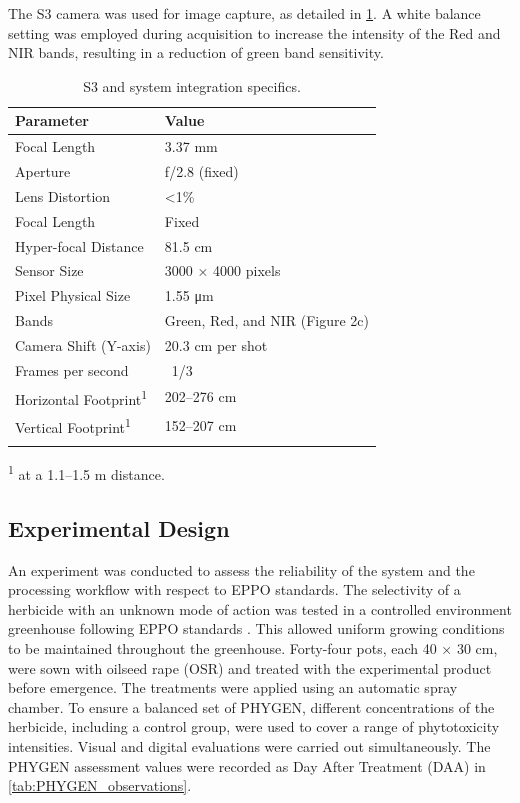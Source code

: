 \documentclass[12pt,a4paper,oneside]{report}
\begin{document}
The S3 camera was used for image capture, as detailed in \cref{tab:system_specifics}. A white balance setting was employed during acquisition to increase the intensity of the Red and NIR bands, resulting in a reduction of green band sensitivity.

\begin{table}[H]
\centering
\caption{S3 and system integration specifics.}
\begin{tabular}{p{5cm} p{5cm}}
\toprule
\textbf{Parameter} & \textbf{Value} \\
\midrule
Focal Length & 3.37 mm \\
Aperture & f/2.8 (fixed) \\
Lens Distortion & <1\% \\
Focal Length & Fixed \\
Hyper-focal Distance & 81.5 cm \\
Sensor Size & 3000 × 4000 pixels \\
Pixel Physical Size	& 1.55 μm \\
Bands & Green, Red, and NIR (Figure 2c) \\
Camera Shift (Y-axis)	& 20.3 cm per shot \\
Frames per second	& ~1/3 \\
Horizontal Footprint\textsuperscript{1}	& 202–276 cm \\
Vertical Footprint\textsuperscript{1}	& 152–207 cm \\
\bottomrule
\label{tab:system_specifics}
\end{tabular}
\footnotesize{\textsuperscript{1} at a 1.1–1.5 m distance.}
\end{table}

\subsection{Experimental Design}

An experiment was conducted to assess the reliability of the system and the processing workflow with respect to EPPO standards. The selectivity of a herbicide with an unknown mode of action was tested in a controlled environment greenhouse following EPPO standards 
\cite{PP11352014,DesignAnalysisEfficacy2012,PP13192021,PP11812022}. This allowed uniform growing conditions to be maintained throughout the greenhouse. Forty-four pots, each 40 × 30 cm, were sown with oilseed rape (OSR) and treated with the experimental product before emergence. The treatments were applied using an automatic spray chamber. To ensure a balanced set of PHYGEN, different concentrations of the herbicide, including a control group, were used to cover a range of phytotoxicity intensities. Visual and digital evaluations were carried out simultaneously. The PHYGEN assessment values were recorded as Day After Treatment (DAA) in
\cref{tab:PHYGEN_observations}.
\end{document}
